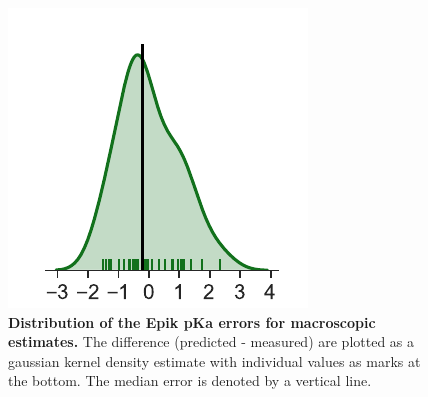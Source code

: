 \documentclass[9pt,lineno,final]{elife}
\begin{document}
\begin{figure}
 \centering
 \includegraphics{Reports/Experiment-Epik-Scan-align-distribution.pdf}
 \caption{{\bf Distribution of the Epik pKa errors for macroscopic estimates.} The difference (predicted - measured) are plotted as a gaussian kernel density estimate with individual values as marks at the bottom. The median error is denoted by a vertical line.}
\end{figure}
\end{document}
